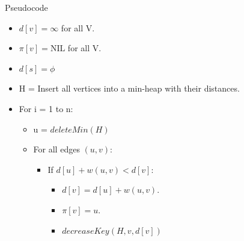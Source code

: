 \documentclass{beamer}
\begin{document}
\begin{frame}{Pseudocode}
    \begin{tcolorbox}[colback=gray!10,colframe=red!75!black,title=Dijkstra’s Algorithm:]

    \begin{itemize}
            \item  $d[v] = \infty$ for all V.
            \item  $\pi[v] = \text{NIL}$ for all V.
            \item  $d[s] = \phi$
            \item H = Insert all vertices into a min-heap with their distances.
            \item For i = 1 to n:
            \begin{itemize}
                \item u = $deleteMin(H)$
                \item For all edges $(u, v)$:
                \begin{itemize}
                \item If $d[u] + w(u, v) < d[v]$:
                    \begin{itemize}
                    \item $d[v] = d[u] + w(u, v)$.
                    \item $\pi[v] = u$.
                    \item $decreaseKey(H,v,d[v])$
                    \end{itemize}
                \end{itemize}
            \end{itemize}
            
        
    \end{itemize}
    \end{tcolorbox}
\end{frame}
\end{document}
